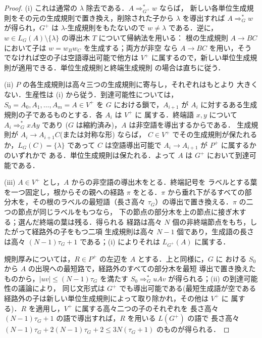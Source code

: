 \documentclass[11pt,a4paper]{ltjsarticle}
\numberwithin{equation}{section}
\theoremstyle{plain}
\theoremstyle{definition}
\theoremstyle{remark}
\theoremstyle{plain}
\begin{document}
\begin{proof}
(i) これは通常の $\lambda$ 除去である．$A\Rightarrow_{G^+}^*w$ ならば，
新しい各単位生成規則をその元の生成規則で置き換え，削除された子から
$\lambda$ を導出すれば $A\Rightarrow_G^*w$ が得られ，$G^+$ は
$\lambda$-生成規則をもたないので $w\ne\lambda$ である．逆に，
$w\in L_G(A)\setminus\{\lambda\}$ の導出木 $T$ について帰納法を用いる：
根の生成規則 $A\to BC$ において子は $w=w_Bw_C$ を生成する；両方が非空
なら $A\to BC$ を用い，そうでなければ空の子は空語導出可能で他方は $V^+$
に属するので，新しい単位生成規則が適用できる．単位生成規則と終端生成規則
の場合は直ちに従う．

(ii) $P$ の各生成規則は高々三つの生成規則に寄与し，それぞれはもとより
大きくない．生産性は (i) から従う．到達可能性については，
$S_0=A_0,A_1,\ldots,A_m=A\in V^+$ を $G$ における鎖で，$A_{i+1}$ が
$A_i$ に対するある生成規則の子であるものとする．各 $A_i$ は $V^+$ に
属する．終端語 $x,y$ について $A_i\Rightarrow_G^*xAy$ であり
\textup($G$ は縮約済み\textup)，$A$ は非空語を導出するからである．
生成規則が $A_i\to A_{i+1}C$\textup(または対称な形\textup) ならば，
$C\in V^+$ でその生成規則が保たれるか，$L_G(C)=\{\lambda\}$ であって
$C$ は空語導出可能で $A_i\to A_{i+1}$ が $P^+$ に属するかのいずれかで
ある．単位生成規則は保たれる．よって $A$ は $G^+$ において到達可能である．

(iii) $A\in V^+$ とし，$A$ からの非空語の導出木をとる．終端記号を
ラベルとする葉を一つ固定し，根からその親への経路 $\pi$ をとる．$\pi$
から垂れ下がるすべての部分木を，その根のラベルの最短語（長さ高々
$\tau_G$）の導出で置き換える．$\pi$ の二つの節点が同じラベルをもつなら，
下の節点の部分木を上の節点に接ぎ木する；選んだ終端の葉は残る．得られる
経路は高々 $N$ 個の非終端節点をもち，したがって経路外の子をもつ二項
生成規則は高々 $N-1$ 個であり，生成語の長さは高々 $(N-1)\tau_G+1$
である；(i) によりそれは $L_{G^+}(A)$ に属する．

規則厚みについては，$R\in P^+$ の左辺を $A$ とする．上と同様に，$G$ に
おける $S_0$ から $A$ の出現への最短路で，経路外のすべての部分木を最短
導出で置き換えたものから，$|uv|\le(N-1)\tau_G$ を満たす
$S_0\Rightarrow_G^*uAv$ が得られる；(ii) の到達可能性の議論により，
同じ文形式は $G^+$ でも導出可能である\textup(最短生成語が空である
経路外の子は新しい単位生成規則によって取り除かれ，その他は $V^+$ に
属する\textup)．$R$ を適用し，$V^+$ に属する高々二つの子のそれぞれを
長さ高々 $(N-1)\tau_G+1$ の語で導出すれば，$R$ を用いる $L(G^+)$ の語で
長さ高々 $(N-1)\tau_G+2(N-1)\tau_G+2\le3N(\tau_G+1)$ のものが得られる．
\end{proof}
\end{document}
